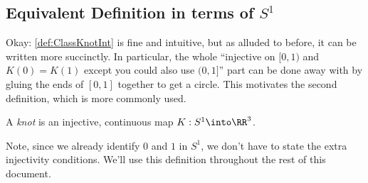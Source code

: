 \subsection{Equivalent Definition in terms of $S^1$}

Okay: \cref{def:ClassKnotInt} is fine and intuitive, but as alluded to
before, it can be written more succinctly. In particular, the whole
``injective on $[0,1)$ and $K(0) = K(1)$ except you could also use
$(0,1]$'' part can be done away with by gluing the ends of $[0,1]$
together to get a circle. This motivates the second definition, which
is more commonly used.

\begin{definition}\label{def:ClassKnotS1}
  A \emph{knot} is an injective, continuous map $K : S^1 \into \RR^3$.
\end{definition}
Note, since we already identify $0$ and $1$ in $S^1$, we don't have to
state the extra injectivity conditions. We'll use this definition
throughout the rest of this document.%

